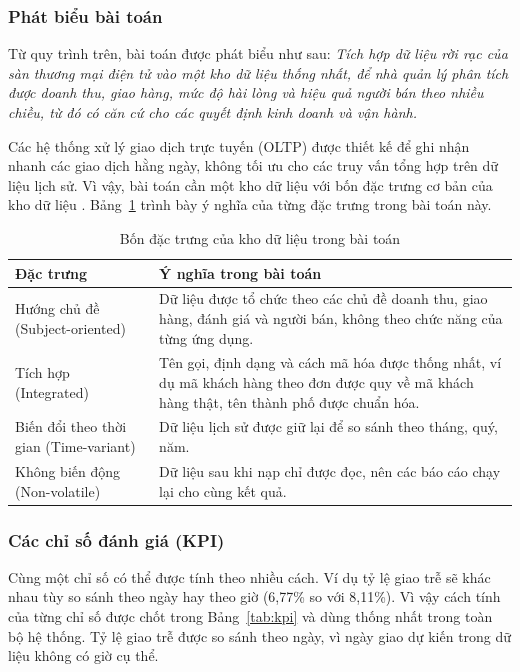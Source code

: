 

\subsubsection{Phát biểu bài toán}

Từ quy trình trên, bài toán được phát biểu như sau: \textit{Tích hợp dữ liệu rời rạc của sàn thương mại điện tử vào một kho dữ liệu thống nhất, để nhà quản lý phân tích được doanh thu, giao hàng, mức độ hài lòng và hiệu quả người bán theo nhiều chiều, từ đó có căn cứ cho các quyết định kinh doanh và vận hành.}

Các hệ thống xử lý giao dịch trực tuyến (OLTP) được thiết kế để ghi nhận nhanh các giao dịch hằng ngày, không tối ưu cho các truy vấn tổng hợp trên dữ liệu lịch sử. Vì vậy, bài toán cần một kho dữ liệu với bốn đặc trưng cơ bản của kho dữ liệu \cite{inmon}. Bảng~\ref{tab:dactrung} trình bày ý nghĩa của từng đặc trưng trong bài toán này.

\begin{table}[H]
\centering
\small{}
\caption{Bốn đặc trưng của kho dữ liệu trong bài toán}
\label{tab:dactrung}
\begin{tabularx}{\linewidth}{|p{3.6cm}|X|}
\hline
\textbf{Đặc trưng} & \textbf{Ý nghĩa trong bài toán}\\ \hline
Hướng chủ đề (Subject-oriented) & Dữ liệu được tổ chức theo các chủ đề doanh thu, giao hàng, đánh giá và người bán, không theo chức năng của từng ứng dụng.\\ \hline
Tích hợp (Integrated) & Tên gọi, định dạng và cách mã hóa được thống nhất, ví dụ mã khách hàng theo đơn được quy về mã khách hàng thật, tên thành phố được chuẩn hóa.\\ \hline
Biến đổi theo thời gian (Time-variant) & Dữ liệu lịch sử được giữ lại để so sánh theo tháng, quý, năm.\\ \hline
Không biến động (Non-volatile) & Dữ liệu sau khi nạp chỉ được đọc, nên các báo cáo chạy lại cho cùng kết quả.\\ \hline
\end{tabularx}
\end{table}

\subsubsection{Các chỉ số đánh giá (KPI)}

Cùng một chỉ số có thể được tính theo nhiều cách. Ví dụ tỷ lệ giao trễ sẽ khác nhau tùy so sánh theo ngày hay theo giờ (6,77\% so với 8,11\%). Vì vậy cách tính của từng chỉ số được chốt trong Bảng~\ref{tab:kpi} và dùng thống nhất trong toàn bộ hệ thống. Tỷ lệ giao trễ được so sánh theo ngày, vì ngày giao dự kiến trong dữ liệu không có giờ cụ thể.


